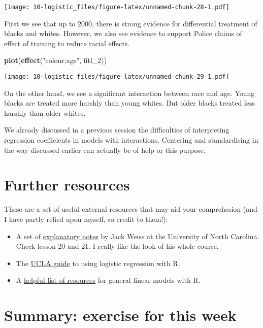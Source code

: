 \documentclass[
]{book}
\newenvironment{Shaded}{\begin{snugshade}}{\end{snugshade}}
\newcommand{\FunctionTok}[1]{\textcolor[rgb]{0.13,0.29,0.53}{\textbf{#1}}}
\newcommand{\NormalTok}[1]{#1}
\newcommand{\StringTok}[1]{\textcolor[rgb]{0.31,0.60,0.02}{#1}}
\begin{document}
\texttt{[image: 10-logistic\_files/figure-latex/unnamed-chunk-28-1.pdf]}

First we see that up to 2000, there is strong evidence for differential treatment of blacks and whites. However, we also see evidence to support Police claims of effect of training to reduce racial effects.

\begin{Shaded}
\begin{Highlighting}[]
\FunctionTok{plot}\NormalTok{(}\FunctionTok{effect}\NormalTok{(}\StringTok{"colour:age"}\NormalTok{, fitl\_2))}
\end{Highlighting}
\end{Shaded}

\texttt{[image: 10-logistic\_files/figure-latex/unnamed-chunk-29-1.pdf]}

On the other hand, we see a significant interaction between race and age. Young blacks are treated more harshly than young whites. But older blacks treated less harshly than older whites.

We already discussed in a previous session the difficulties of interpreting regression coefficients in models with interactions. Centering and standardising in the way discussed earlier can actually be of help or this purpose.

\section{Further resources}\label{further-resources-2}

These are a set of useful external resources that may aid your comprehesion (and I have partly relied upon myself, so credit to them!):

\begin{itemize}
\item
  A set of \href{http://www.unc.edu/courses/2010fall/ecol/563/001/docs/lectures/lecture20.htm\#dealing}{explanatory notes} by Jack Weiss at the University of North Carolina. Check lesson 20 and 21. I really like the look of his whole course.
\item
  The \href{http://www.ats.ucla.edu/stat/r/dae/logit.htm}{UCLA guide} to using logistic regression with R.
\item
  A \href{http://www.r-bloggers.com/some-r-resources-for-glms/}{helpful list of resources} for general linear models with R.
\end{itemize}

\section{Summary: exercise for this week}\label{summary-exercise-for-this-week-8}
\end{document}
